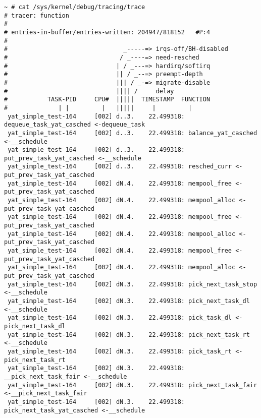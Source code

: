 \begin{tcolorbox} [
    enhanced,
    colback=orange!5,
    colframe=orange!40!black,
    leftrule=3mm,
    rightrule=0mm,
    toprule=0mm,
    bottomrule=0mm,
    arc=2mm,
    left=5mm,
    right=5mm,
    top=3mm,
    bottom=3mm,
    fonttitle=\bfseries,
    title=\textbf{ftrace输出示例}
]
\begin{lstlisting}[basicstyle=\footnotesize\fontfamily{zi4}\selectfont, showstringspaces=false]
~ # cat /sys/kernel/debug/tracing/trace
# tracer: function
#
# entries-in-buffer/entries-written: 204947/818152   #P:4
#
#                                _-----=> irqs-off/BH-disabled
#                               / _----=> need-resched
#                              | / _---=> hardirq/softirq
#                              || / _--=> preempt-depth
#                              ||| / _-=> migrate-disable
#                              |||| /     delay
#           TASK-PID     CPU#  |||||  TIMESTAMP  FUNCTION
#              | |         |   |||||     |         |
 yat_simple_test-164     [002] d..3.    22.499318: dequeue_task_yat_casched <-dequeue_task
 yat_simple_test-164     [002] d..3.    22.499318: balance_yat_casched <-__schedule
 yat_simple_test-164     [002] d..3.    22.499318: put_prev_task_yat_casched <-__schedule
 yat_simple_test-164     [002] d..3.    22.499318: resched_curr <-put_prev_task_yat_casched
 yat_simple_test-164     [002] dN.4.    22.499318: mempool_free <-put_prev_task_yat_casched
 yat_simple_test-164     [002] dN.4.    22.499318: mempool_alloc <-put_prev_task_yat_casched
 yat_simple_test-164     [002] dN.4.    22.499318: mempool_free <-put_prev_task_yat_casched
 yat_simple_test-164     [002] dN.4.    22.499318: mempool_alloc <-put_prev_task_yat_casched
 yat_simple_test-164     [002] dN.4.    22.499318: mempool_free <-put_prev_task_yat_casched
 yat_simple_test-164     [002] dN.4.    22.499318: mempool_alloc <-put_prev_task_yat_casched
 yat_simple_test-164     [002] dN.3.    22.499318: pick_next_task_stop <-__schedule
 yat_simple_test-164     [002] dN.3.    22.499318: pick_next_task_dl <-__schedule
 yat_simple_test-164     [002] dN.3.    22.499318: pick_task_dl <-pick_next_task_dl
 yat_simple_test-164     [002] dN.3.    22.499318: pick_next_task_rt <-__schedule
 yat_simple_test-164     [002] dN.3.    22.499318: pick_task_rt <-pick_next_task_rt
 yat_simple_test-164     [002] dN.3.    22.499318: __pick_next_task_fair <-__schedule
 yat_simple_test-164     [002] dN.3.    22.499318: pick_next_task_fair <-__pick_next_task_fair
 yat_simple_test-164     [002] dN.3.    22.499318: pick_next_task_yat_casched <-__schedule

\end{lstlisting}
\end{tcolorbox}
